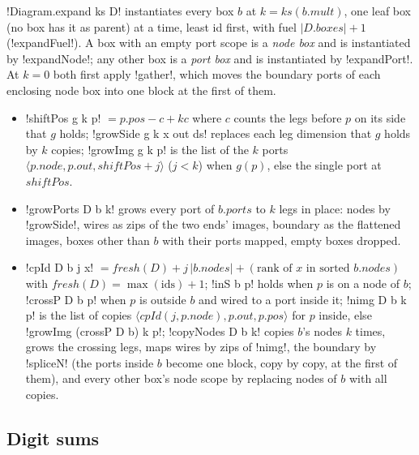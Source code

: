 {\lbx!Diagram.expand ks D! instantiates every box $b$ at $k=\mathit{ks}(b.\mathit{mult})$, one leaf box (no box has it as parent) at a time, least id first, with fuel $|D.\mathit{boxes}|+1$ (\lbx!expandFuel!). A box with an empty port scope is a \emph{node box} and is instantiated by \lbx!expandNode!; any other box is a \emph{port box} and is instantiated by \lbx!expandPort!. At $k=0$ both first apply \lbx!gather!, which moves the boundary ports of each enclosing node box into one block at the first of them.
\begin{itemize}
\item \lbx!shiftPos g k p! $=p.\mathit{pos}-c+kc$ where $c$ counts the legs before $p$ on its side that $g$ holds; \lbx!growSide g k x out ds! replaces each leg dimension that $g$ holds by $k$ copies; \lbx!growImg g k p! is the list of the $k$ ports $\langle p.\mathit{node},p.\mathit{out},\mathit{shiftPos}+j\rangle$ ($j<k$) when $g(p)$, else the single port at $\mathit{shiftPos}$.
\item \lbx!growPorts D b k! grows every port of $b.\mathit{ports}$ to $k$ legs in place: nodes by \lbx!growSide!, wires as zips of the two ends' images, boundary as the flattened images, boxes other than $b$ with their ports mapped, empty boxes dropped.
\item \lbx!cpId D b j x! $=\mathit{fresh}(D)+j\,|b.\mathit{nodes}|+(\text{rank of } x \text{ in sorted } b.\mathit{nodes})$ with $\mathit{fresh}(D)=\max(\text{ids})+1$; \lbx!inS b p! holds when $p$ is on a node of $b$; \lbx!crossP D b p! when $p$ is outside $b$ and wired to a port inside it; \lbx!nimg D b k p! is the list of copies $\langle\mathit{cpId}(j,p.\mathit{node}),p.\mathit{out},p.\mathit{pos}\rangle$ for $p$ inside, else \lbx!growImg (crossP D b) k p!; \lbx!copyNodes D b k! copies $b$'s nodes $k$ times, grows the crossing legs, maps wires by zips of \lbx!nimg!, the boundary by \lbx!spliceN! (the ports inside $b$ become one block, copy by copy, at the first of them), and every other box's node scope by replacing nodes of $b$ with all copies.
\end{itemize}

\subsection{Digit sums}\label{sec:boxes-recall-digits}

}

